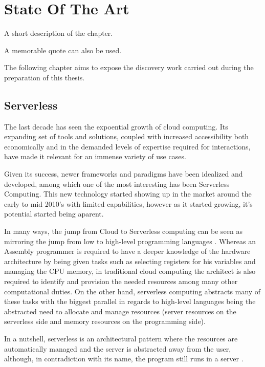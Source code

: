 \chapter{State Of The Art}
\label{chapter:SOTA}

\begin{introduction}
A short description of the chapter.

A memorable quote can also be used.
\end{introduction}

The following chapter aims to expose the discovery work carried out during the preparation of this thesis.

\section{Serverless}
The last decade has seen the expoential growth of cloud computing. 
Its expanding set of tools and solutions, coupled with increased accessibility both economically and in the demanded levels of expertise required for interactions, have made it relevant for an immense variety of use cases.\par

Given its success, newer frameworks and paradigms have been idealized and developed, among which one of the most interesting has been Serverless Computing. 
This new technology started showing up in the market around the early to mid 2010's with limited capabilities, however as it started growing, it's potential started being aparent.\par

In many ways, the jump from Cloud to Serverless computing can be seen as mirroring the jump from low to high-level programming languages \cite{DBLP:journals/corr/abs-1902-03383}. 
Whereas an Assembly programmer is required to have a deeper knowledge of the hardware architecture by being given tasks such as selecting registers for his variables and managing the CPU memory, in traditional cloud computing the architect is also required to identify and provision the needed resources among many other computational duties. 
On the other hand, serverless computing abstracts many of these tasks with the biggest parallel in regards to high-level languages being the abstracted need to allocate and manage resources (server resources on the serverless side and memory resources on the programming side).\par

In a nutshell, serverless is an architectural pattern where the resources are automatically managed and the server is abstracted away from the user, although, in contradiction with its name, the program still runs in a server \cite{Buyya2019}.


